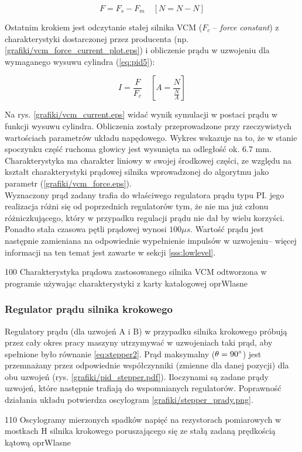 \begin{equation} \label{eq:pid5}
	F = F_s - F_m \quad [ N = N - N ]
\end{equation}

Ostatnim krokiem jest odczytanie stałej silnika VCM ($ F_c $ -- {\it force constant}) z charakterystyki dostarczonej przez producenta (np. \ref{grafiki/vcm_force_current_plot.eps}) i obliczenie prądu w uzwojeniu dla wymaganego wysuwu cylindra (\ref{eq:pid5}):

\begin{equation} \label{eq:pid6}
	I = \frac{F}{F_c} \quad [ A = \frac{N}{\frac{N}{A}} ]
\end{equation}
	
Na rys. \ref{grafiki/vcm_current.eps} widać wynik symulacji w postaci prądu w funkcji wysuwu cylindra. Obliczenia zostały przeprowadzone przy rzeczywistych wartościach parametrów układu napędowego. Wykres wskazuje na to, że w stanie spoczynku część ruchoma głowicy jest wysunięta na odległość ok. 6.7 mm. Charakterystyka ma charakter liniowy w swojej środkowej części, ze względu na kształt charakterystyki prądowej silnika wprowadzonej do algorytmu jako parametr (\ref{grafiki/vcm_force.eps}). \\


Wyznaczony prąd zadany trafia do właściwego regulatora prądu typu PI. jego realizacja różni się od poprzednich regulatorów tym, że nie ma już członu różniczkującego, który w przypadku regulacji prądu nie dał by wielu korzyści. Ponadto stała czasowa pętli prądowej wynosi $ 100 \mu s $. Wartość prądu jest następnie zamieniana na odpowiednie wypełnienie impulsów w uzwojeniu-- więcej informacji na ten temat jest zawarte w sekcji \ref{sss:lowlevel}.

	{100}
	{Charakterystyka prądowa zastosowanego silnika VCM odtworzona w programie używając charakterystyki z karty katalogowej}
	{oprWlasne}

\subsubsection{Regulator prądu silnika krokowego}

Regulatory prądu (dla uzwojeń A i B) w przypadku silnika krokowego próbują przez cały okres pracy maszyny utrzymywać w uzwojeniach taki prąd, aby spełnione było równanie \ref{eq:stepper2}. Prąd maksymalny ($ \theta = 90\degree $) jest przemnażany przez odpowiednie współczynniki (zmienne dla danej pozycji) dla obu uzwojeń (rys. \ref{grafiki/pid_stepper.pdf}). Iloczynami są zadane prądy uzwojeń, które następnie trafiają do wspomnianych regulatorów. Poprawność działania układu potwierdza oscylogram \ref{grafiki/stepper_prady.png}.

	{110}
	{Oscylogramy mierzonych spadków napięć na rezystorach pomiarowych w mostkach H silnika krokowego poruszającego się ze stałą zadaną prędkością kątową}
	{oprWlasne}

